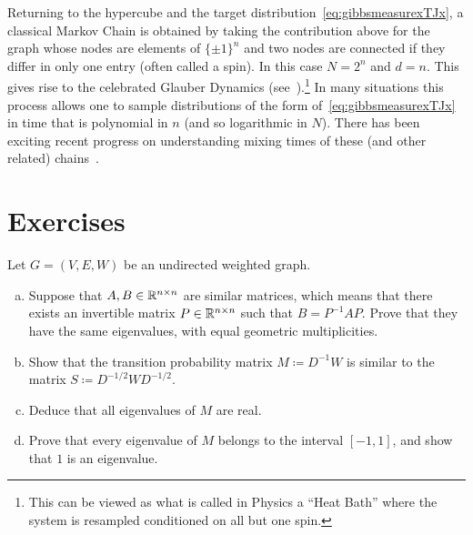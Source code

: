 Returning to the hypercube and the target distribution~\eqref{eq:gibbsmeasurexTJx}, a classical Markov Chain is obtained by taking the contribution above for the graph whose nodes are elements of $\{\pm1\}^n$ and two nodes are connected if they differ in only one entry (often called a spin). In this case $N=2^n$ and $d=n$. This gives rise to the celebrated Glauber Dynamics (see~\cite{levinperesmarkovchains2017}).\footnote{This can be viewed as what is called in Physics a ``Heat Bath'' where the system is resampled conditioned on all but one spin.} In many situations this process allows one to sample distributions of the form of~\eqref{eq:gibbsmeasurexTJx} in time that is polynomial in $n$ (and so logarithmic in $N$). There has been exciting recent progress on understanding mixing times of these (and other related) chains~\cite{AnariLiuOveisGharanFOCS2020,ChenEldan2025LocalizationSchemes}.










\section*{Exercises}

\begin{myexercise}\label{prob:random_walks_evals}
    Let $G = (V, E, W)$ be an undirected weighted graph.
    \begin{enumerate}[(a)]
        \item Suppose that $A, B \in \mathbb{R}^{n\times n}$ are similar matrices, which means that there exists an invertible matrix $P\in \mathbb{R}^{n\times n}$ such that $B = P^{-1} A P$. Prove that they have the same eigenvalues, with equal geometric multiplicities.
        
        \item Show that the transition probability matrix $M \coloneqq D^{-1}W$ is similar to the matrix $S \coloneqq D^{-1/2}W D^{-1/2}$.
        
        \item Deduce that all eigenvalues of $M$ are real.

        \item Prove that every eigenvalue of $M$ belongs to the interval $[-1,1]$, and show that $1$ is an eigenvalue.
    \end{enumerate}
\end{myexercise}

